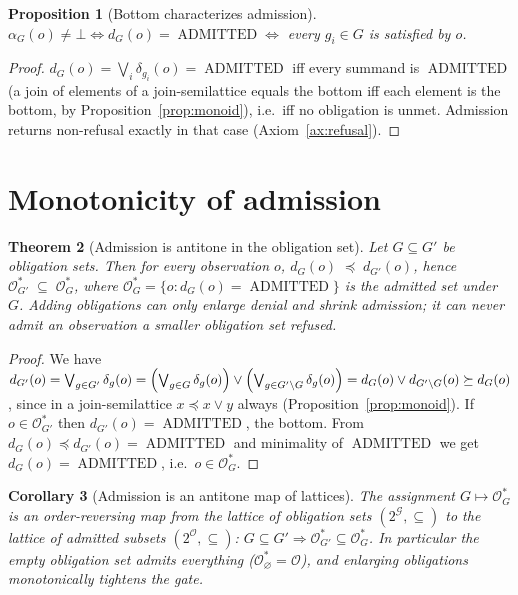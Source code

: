 \documentclass[11pt,oneside]{book}
\theoremstyle{definition}
\theoremstyle{plain}
\newtheorem{theorem}{Theorem}[chapter]
\newtheorem{proposition}[theorem]{Proposition}
\newtheorem{corollary}[theorem]{Corollary}
\theoremstyle{remark}
\newcommand{\Obs}{\mathcal{O}}                 %
\newcommand{\Adm}{\mathcal{O}^{*}}             %
\newcommand{\adm}{\alpha}                      %
\newcommand{\Rfsl}{\bot}                        %
\newcommand{\Adml}{\operatorname{ADMITTED}}          %
\begin{document}
\begin{proposition}[Bottom characterizes admission]\label{prop:bottom}
$\adm_G(o)\ne\Rfsl\iff d_G(o)=\Adml\iff$ every $g_i\in G$ is satisfied by $o$. %
\end{proposition}

\begin{proof}
$d_G(o)=\bigvee_i\delta_{g_i}(o)=\Adml$ iff every summand is $\Adml$ (a join of elements of a join-semilattice equals the bottom iff each element is the bottom, by Proposition~\ref{prop:monoid}), i.e.\ iff no obligation is unmet. %
Admission returns non-refusal exactly in that case (Axiom~\ref{ax:refusal}). %
\end{proof}

\section{Monotonicity of admission}

\begin{theorem}[Admission is antitone in the obligation set]\label{thm:mono}
Let $G\subseteq G'$ be obligation sets. %
Then for every observation $o$, $d_G(o)\;\preceq\;d_{G'}(o)$, hence $\Adm_{G'}\;\subseteq\;\Adm_{G}$, where $\Adm_G=\{o:d_G(o)=\Adml\}$ is the admitted set under $G$. %
Adding obligations can only enlarge denial and shrink admission; it can never admit an observation a smaller obligation set refused. %
\end{theorem}

\begin{proof}
We have $d_{G'}(o)=\bigvee_{g\in G'}\delta_g(o)=\Bigl(\bigvee_{g\in G}\delta_g(o)\Bigr)\lor \Bigl(\bigvee_{g\in G'\setminus G}\delta_g(o)\Bigr)=d_G(o)\lor d_{G'\setminus G}(o)\succeq d_G(o)$, since in a join-semilattice $x\preceq x\lor y$ always (Proposition~\ref{prop:monoid}). %
If $o\in\Adm_{G'}$ then $d_{G'}(o)=\Adml$, the bottom. %
From $d_G(o)\preceq d_{G'}(o)=\Adml$ and minimality of $\Adml$ we get $d_G(o)=\Adml$, i.e.\ $o\in\Adm_G$. %
\end{proof}

\begin{corollary}[Admission is an antitone map of lattices]\label{cor:galois}
The assignment $G\mapsto\Adm_G$ is an order-reversing map from the lattice of obligation sets $(2^{\mathcal{G}},\subseteq)$ to the lattice of admitted subsets $(2^{\Obs},\subseteq)$: $G\subseteq G'\Rightarrow\Adm_{G'}\subseteq\Adm_G$. %
In particular the empty obligation set admits everything ($\Adm_\varnothing=\Obs$), and enlarging obligations monotonically tightens the gate. %
\end{corollary}
\end{document}
